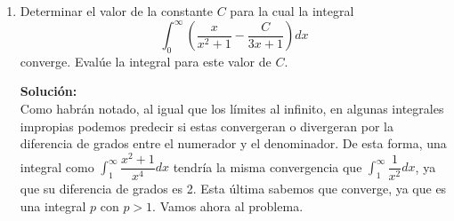 \documentclass[12pt]{article}
\newenvironment{solucion}
{\begin{mdframed}[backgroundcolor=black!10]
		{\bf Solución:}\\
	}
	{
	\end{mdframed}
}
\newenvironment{preguntas}
{\begin{enumerate}\itemsep12pt
	}
	{
	\end{enumerate}
}
\newcommand{\ev}{\Big|}
\newcommand{\ra}{\rightarrow}
\begin{document}
\begin{preguntas}
\begin{solucion}
\begin{enumerate}[a)]
\item $\sum\limits_{n=20}^{\infty}\dfrac{1}{nln(n)ln(ln(n))}$\\
			\\
			Sea
			$$a_n = \dfrac{1}{nln(n)ln(ln(n))} \ra f(x) = \dfrac{1}{xln(x)ln(ln(x))}$$
			Usando el criterio de la integral, $\displaystyle\int_{20}^{\infty}f(x)dx$ se comportará igual que $\sum\limits_{n=20}^{\infty} a_n$, por lo que debemos ver la convergencia de la integral en cuestión
			$$\int_{20}^{\infty} \dfrac{1}{xln(x)ln(ln(x))} dx$$
			Usando $u=ln(ln(x)) \ra du = \dfrac{dx}{xln(x)}$,
			$$\int_{20}^{\infty} \dfrac{1}{xln(x)ln(ln(x))} dx
			= \int_{ln(ln(20))}^{\infty} \dfrac{du}{u} = ln(u) \ev_{ln(ln(20))}^{\infty}$$
			$$ = ln(\infty) - ln(ln(ln(20))) = \infty = \not \exists$$
			Finalmente, por el criterio de la integral, la serie converge.
\item  $\sum\limits_{n=1}^{\infty}ln\left(1+\dfrac{1}{n}\right)$\\
			\\
			Notemos que
			$$\sum\limits_{n=1}^{\infty} ln\left(1+\dfrac{1}{n}\right)
			= \sum\limits_{n=1}^{\infty} ln\left(\dfrac{n+1}{n}\right)
			= \sum\limits_{n=1}^{\infty} ln(n+1)-ln(n)$$
			Es una serie telescopica. Expandiendo términos
			$$= (ln(2)-ln(1)) + (ln(3)-ln(2)) + \dots + (ln(n) - ln(n-1)) + (ln(n+1) - ln(n))$$
			$$= (\cancel{ln(2)}-ln(1)) + (\cancel{ln(3)}-\cancel{ln(2)}) + \cancel{\dots} + (\cancel{ln(n)} - \cancel{ln(n-1)}) + (ln(n+1) - \cancel{ln(n)})$$
			$$= ln(n+1) - ln(1)$$
			$$\lim\limits_{n \ra \infty} ln(n+1) = ln(\infty) = \infty = \not \exists$$
			Finalmente, la serie es divergente.
\end{enumerate}
\end{solucion}
\item Determinar el valor de la constante $C$ para la cual la integral
	$$\displaystyle\int_{0}^{\infty} \left( \dfrac{x}{x^2+1} - \dfrac{C}{3x+1}\right)dx$$
	converge. Evalúe la integral para este valor de $C$.
\begin{solucion}
Como habrán notado, al igual que los límites al infinito, en algunas integrales impropias podemos predecir si estas convergeran o divergeran por la diferencia de grados entre el numerador y el denominador. De esta forma, una integral como $\displaystyle\int_1^{\infty} \dfrac{x^2+1}{x^4}dx$ tendría la misma convergencia que $\displaystyle\int_1^{\infty} \dfrac{1}{x^2}dx$, ya que su diferencia de grados es 2. Esta última sabemos que converge, ya que es una integral $p$ con $p>1$. Vamos ahora al problema.\\

\end{solucion}
\end{preguntas}
\end{document}
